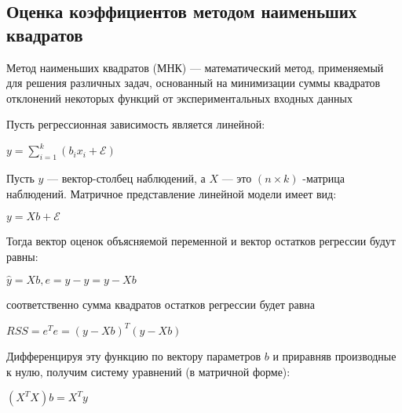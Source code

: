 \documentclass[../document.tex]{subfiles}
\begin{document}
	\subsection{Оценка коэффициентов методом наименьших квадратов}
	\par Метод наименьших квадратов (МНК) — математический метод, применяемый для решения различных задач, основанный на минимизации суммы квадратов отклонений некоторых функций от экспериментальных входных данных
	\par Пусть регрессионная зависимость является линейной:
	\par $y = \sum\limits_{i=1}^k (b_ix_i + \mathcal{E})$
	\par Пусть $y$ — вектор-столбец наблюдений, а $X$  — это $(n\times k)$ -матрица наблюдений. Матричное представление линейной модели имеет вид:
	\par $y = Xb + \mathcal{E}$
	\par Тогда вектор оценок объясняемой переменной и вектор остатков регрессии будут равны:
	\par $\hat{y} = Xb, e = y - \hat{y} = y - Xb$
	\par соответственно сумма квадратов остатков регрессии будет равна 
	\par $RSS = e^Te = (y - Xb)^T(y-Xb)$
	\par Дифференцируя эту функцию по вектору параметров $b$ и приравняв производные к нулю, получим систему уравнений (в матричной форме):
	\par $(X^TX)b = X^Ty$
\end{document}
